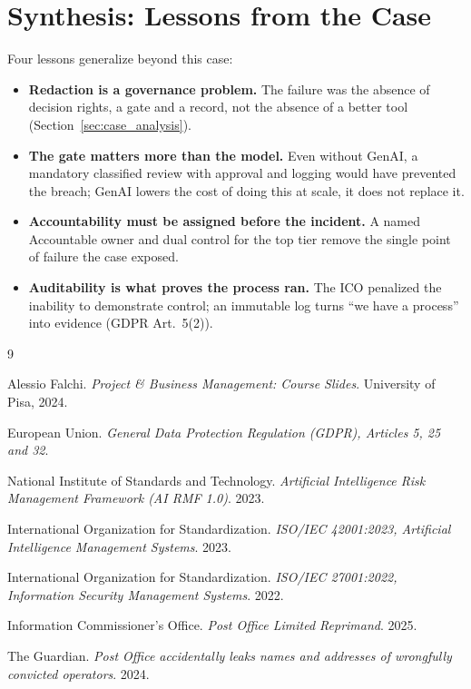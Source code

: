 \documentclass[12pt,a4paper]{article}
\begin{document}
\section{Synthesis: Lessons from the Case}
\label{sec:lessons}

Four lessons generalize beyond this case:

\begin{itemize}
  \item \textbf{Redaction is a governance problem.} The failure was the absence of decision rights, a gate and a record, not the absence of a better tool (Section~\ref{sec:case_analysis}).
  \item \textbf{The gate matters more than the model.} Even without GenAI, a mandatory classified review with approval and logging would have prevented the breach; GenAI lowers the cost of doing this at scale, it does not replace it.
  \item \textbf{Accountability must be assigned before the incident.} A named Accountable owner and dual control for the top tier remove the single point of failure the case exposed.
  \item \textbf{Auditability is what proves the process ran.} The ICO penalized the inability to demonstrate control; an immutable log turns ``we have a process'' into evidence (GDPR Art.~5(2)).
\end{itemize}

\newpage
\begin{thebibliography}{9}

Alessio Falchi.
\textit{Project \& Business Management: Course Slides}.
University of Pisa, 2024.

European Union.
\textit{General Data Protection Regulation (GDPR), Articles 5, 25 and 32}.

National Institute of Standards and Technology.
\textit{Artificial Intelligence Risk Management Framework (AI RMF 1.0)}.
2023.

International Organization for Standardization.
\textit{ISO/IEC 42001:2023, Artificial Intelligence Management Systems}.
2023.

International Organization for Standardization.
\textit{ISO/IEC 27001:2022, Information Security Management Systems}.
2022.

Information Commissioner's Office.
\textit{Post Office Limited Reprimand}.
2025.

The Guardian.
\textit{Post Office accidentally leaks names and addresses of wrongfully convicted operators}.
2024.

\end{thebibliography}
\end{document}
